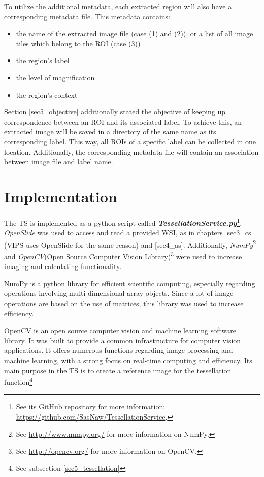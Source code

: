 To utilize the additional metadata, each extracted region will also have a corresponding metadata file. This metadata contains:
\begin{itemize}
	\item the name of the extracted image file (case (1) and (2)), or a list of all image tiles which belong to the ROI (case (3))
	\item the region's label
	\item the level of magnification
	\item the region's context
\end{itemize}

Section \ref{sec5_objective} additionally stated the objective of keeping up correspondence between an ROI and its associated label. To achieve this, an extracted image will be saved in a directory of the same name as its corresponding label. This way, all ROIs of a specific label can be collected in one location. Additionally, the corresponding metadata file will contain an association between image file and label name.


\section{Implementation}
\label{sec5_impl}
The TS is implemented as a python script called \textbf{\emph{TessellationService.py}}\footnote{
	See its GitHub repository for more information: \url{https://github.com/SasNaw/TessellationService}.
}. \emph{OpenSlide} was used to access and read a provided WSI, as in chapters \ref{sec3_cs} (VIPS uses OpenSlide for the same reason\cite{cupitt96}) and \ref{sec4_as}. Additionally, \emph{NumPy}\footnote{
	See \url{http://www.numpy.org/} for more information on NumPy.
} and \emph{OpenCV}(Open Source Computer Vision Library)\footnote{
	See \url{http://opencv.org/} for more information on OpenCV.
} were used to increase imaging and calculating functionality.

NumPy is a python library for efficient scientific computing, especially regarding operations involving multi-dimensional array objects\cite{Walt11}. Since a lot of image operations are based on the use of matrices, this library was used to increase efficiency.

OpenCV  is an open source computer vision and machine learning software library. It was built to provide a common infrastructure for computer vision applications. It offers numerous functions regarding image processing and machine learning, with a strong focus on real-time computing and efficiency\cite{Bradski08}. Its main purpose in the TS is to create a reference image for the tessellation function\footnote{
	See subsection \ref{sec5_tessellation}
}

